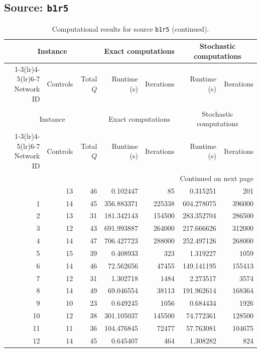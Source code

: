\documentclass{article}
\begin{document}
\begin{landscape}
\subsection*{Source: \texttt{b1r5}}

\begin{longtable}{rrrrrrr}
\caption{Computational results for source \texttt{b1r5}.}\\
\toprule
\multicolumn{3}{c}{Instance} & \multicolumn{2}{c}{Exact computations} & \multicolumn{2}{c}{Stochastic computations} \\
\cmidrule(lr){1-3}\cmidrule(lr){4-5}\cmidrule(lr){6-7}
Network ID & Controls & Total $Q$ & Runtime (s) & Iterations & Runtime (s) & Iterations \\
\midrule
\endfirsthead
\caption[]{Computational results for source \texttt{b1r5} (continued).}\\
\toprule
\multicolumn{3}{c}{Instance} & \multicolumn{2}{c}{Exact computations} & \multicolumn{2}{c}{Stochastic computations} \\
\cmidrule(lr){1-3}\cmidrule(lr){4-5}\cmidrule(lr){6-7}
Network ID & Controls & Total $Q$ & Runtime (s) & Iterations & Runtime (s) & Iterations \\
\midrule
\endhead
\midrule
\multicolumn{7}{r}{Continued on next page} \\
\endfoot
\bottomrule
\endlastfoot
0 & 13 & 46 & 0.102447 & 85 & 0.315251 & 201 \\
1 & 14 & 45 & 356.883371 & 225338 & 604.278075 & 396000 \\
2 & 13 & 31 & 181.342143 & 154500 & 283.352704 & 286500 \\
3 & 12 & 43 & 691.993887 & 264000 & 217.666626 & 312000 \\
4 & 14 & 47 & 706.427723 & 288000 & 252.497126 & 268000 \\
5 & 15 & 39 & 0.408933 & 323 & 1.319227 & 1059 \\
6 & 14 & 46 & 72.562656 & 47455 & 149.141195 & 155413 \\
7 & 12 & 31 & 1.302718 & 1484 & 2.273517 & 3574 \\
8 & 14 & 49 & 69.046554 & 38113 & 191.962614 & 168364 \\
9 & 10 & 23 & 0.649245 & 1056 & 0.684434 & 1926 \\
10 & 12 & 38 & 301.105037 & 145500 & 74.772361 & 128500 \\
11 & 11 & 36 & 104.476845 & 72477 & 57.763081 & 104675 \\
12 & 14 & 45 & 0.645407 & 464 & 1.308282 & 824 \\

\end{longtable}
\end{landscape}
\end{document}
